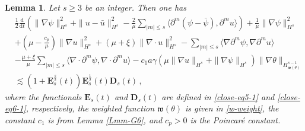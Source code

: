 \documentclass[reqno,11pt]{amsart}
\newtheorem{lemma}{Lemma}[section]
\numberwithin{equation}{section}
\def\d{\mathrm{d}}
\def\w{\mathfrak{w}}
\begin{document}
\begin{lemma}\label{Lmm-G7}
  Let $s \ge 3$ be an integer. Then one has
\begin{equation}\label{gpsi-eq-estimate}
\begin{aligned}
& \frac{1}{2} \frac{\d}{\d t} \left( \| \nabla \psi\|_{H^s}^2 + \|u - \bar{u}\|_{H^s}^2 - \frac{2}{\mu} \sum_{|m| \leq s} \langle \partial^m (\psi - \bar{\psi}), \partial^m u \rangle \right) + \frac{1}{\mu} \|\nabla \psi\|_{H^s}^2 \\
& + ( \mu - \frac{c_p}{\mu} ) \|\nabla u\|_{H^s}^2 + (\mu + \xi) \|\nabla \cdot u\|_{H^s}^2 - \sum_{|m| \leq s} \langle \nabla \partial^m \psi, \nabla \partial^m u \rangle \\
& - \frac{\mu + \xi}{\mu} \sum_{|m| \leq s} \langle \nabla \cdot \partial^m \psi, \nabla \cdot \partial^m u \rangle - c_1 a \gamma ( \mu \| \nabla u \|_{H^s} + \| \nabla \psi \|_{H^s} ) \| \nabla \theta \|_{H^{s-1}_{ \w (\theta) }} \\
& \lesssim \left( 1 + \mathbf{E}_s^\frac{s}{2} (t) \right) \mathbf{E}_s^\frac{1}{2} (t) \mathbf{D}_s (t) \,,
\end{aligned}
\end{equation}
where the functionals $\mathbf{E}_s (t)$ and $\mathbf{D}_s (t)$ are defined  in \eqref{close-eq5-1} and \eqref{close-eq6-1}, respectively, the weighted function $\w (\theta)$ is given in \eqref{w-weight}, the constant $c_1$ is from Lemma \ref{Lmm-G6}, and $c_p > 0$ is the Poincar\'e constant.
\end{lemma}
\end{document}
